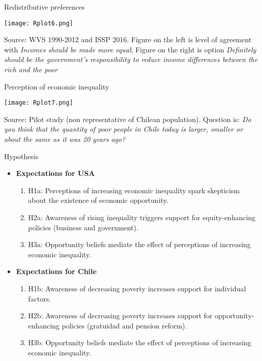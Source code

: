 \documentclass{beamer}
\begin{document}
\begin{frame}{Redistributive preferences} 
\begin{center}
	\texttt{[image: Rplot6.png]}
\end{center}

{\footnotesize Source: WVS 1990-2012 and ISSP 2016. Figure on the left is level of agreement with \textit{Incomes should be made more equal}; Figure on the right is option \textit{Definitely should be the government's responsibility to reduce income differences between the rich and the poor}}

\end{frame}

\begin{frame}{Perception of economic inequality} 
\begin{center}
	\texttt{[image: Rplot7.png]}
\end{center}

{\footnotesize Source: Pilot study (non representative of Chilean population). Question is: \textit{Do you think that the quantity of poor people in Chile today is larger, smaller or about the same as it was 20 years ago?}}

\end{frame}






\begin{frame}{Hypothesis} 

\begin{itemize}
\justifying	
\item \textbf{Expectations for USA}
\medskip
	\begin{enumerate}
	\justifying
	\item H1a: Perceptions of increasing economic inequality spark skepticism about the existence of economic opportunity. 
	\medskip
	\item H2a: Awareness of rising inequality triggers support for equity-enhancing policies (business and government).
	\medskip
	\item H3a: Opportunity beliefs mediate the effect of perceptions of increasing economic inequality.
	\end{enumerate}
\medskip
\medskip
\item \textbf{Expectations for Chile}
\medskip
	\begin{enumerate}
	\justifying
	\item H1b: Awareness of decreasing poverty increases support for individual factors.
	\medskip
	\item H2b: Awareness of decreasing poverty increases support for opportunity-enhancing policies (gratuidad and pension reform). 
	\medskip
	\item H3b: Opportunity beliefs mediate the effect of perceptions of increasing economic inequality.	
	\end{enumerate}
\end{itemize}


\end{frame}
\end{document}
